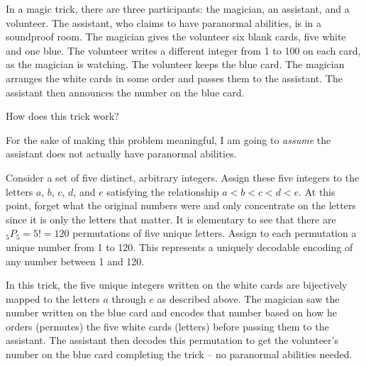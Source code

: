 \newpage
\begin{problem}{15}{5}
  In a magic trick, there are three participants: the magician, an assistant, and a volunteer.  The assistant, who claims to have paranormal abilities, is in a soundproof room.  The magician gives the volunteer six blank cards, five white and one blue.  The volunteer writes a different integer from 1 to 100 on each card, as the magician is watching.  The volunteer keeps the blue card. The magician arranges the white cards in some order and passes them to the assistant. The assistant then announces the number on the blue card.

  How does this trick work?
\end{problem}

For the sake of making this problem meaningful, I am going to \textit{assume} the assistant does not actually have paranormal abilities.

Consider a set of five distinct, arbitrary integers.  Assign these five integers to the letters $a$, $b$, $c$, $d$, and $e$ satisfying the relationship $a < b < c < d < e$.  At this point, forget what the original numbers were and only concentrate on the letters since it is only the letters that matter.  It is elementary to see that there are ${}_{5}P_{5} = 5! = 120$ permutations of five unique letters.  Assign to each permutation a unique number from 1 to 120.  This represents a uniquely decodable encoding of any number between 1 and 120.

In this trick, the five unique integers written on the white cards are bijectively mapped to the letters $a$ through $e$ as described above.  The magician saw the number written on the blue card and encodes that number based on how he orders (permutes) the five white cards (letters) before passing them to the assistant.  The assistant then decodes this permutation to get the volunteer's number on the blue card completing the trick -- no paranormal abilities needed.

